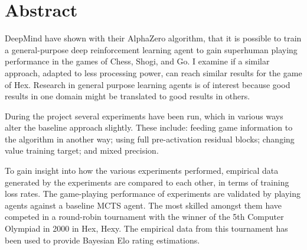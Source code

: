 \chapter{Abstract}
{\itshape{DeepMind have shown with their AlphaZero algorithm, that it is possible to train a general-purpose deep reinforcement learning agent to gain superhuman playing performance in the games of Chess, Shogi, and Go. I examine if a similar approach, adapted to less processing power, can reach similar results for the game of Hex. Research in general purpose learning agents is of interest because good results in one domain might be translated to good results in others.

During the project several experiments have been run, which in various ways alter the baseline approach slightly. These include: feeding game information to the algorithm in another way; using full pre-activation residual blocks; changing value training target; and mixed precision.

To gain insight into how the various experiments performed, empirical data generated by the experiments are compared to each other, in terms of training loss rates. The game-playing performance of experiments are validated by playing agents against a baseline MCTS agent. The most skilled amongst them have competed in a round-robin tournament with the winner of the 5th Computer Olympiad in 2000 in Hex, Hexy. The empirical data from this tournament has been used to provide Bayesian Elo rating estimations.
}}